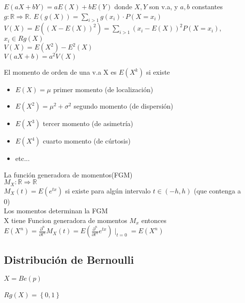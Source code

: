 \documentclass[a4paper,10pt]{article}
\begin{document}
 $E(aX+bY) = aE(X) + bE(Y)$ donde $X,Y$ son v.a, y $a,b$ constantes \\

 $g:\mathbb{R} \Rightarrow \mathbb{R}$. $E(g(X)) = \sum_{i>1} g(x_i) \cdot P(X =x_i)$ \\ 

 $V(X) = E({(X-E(X))}^{2}) = \sum_{i>1} {{(x_i-E(X))}^{2} P(X = x_i)}$, $x_i \in Rg(X)$ \\

\propiedad $V(X) = E(X^2)-E^2(X)$ \\

\propiedad $V(aX+b) = a^2V(X)$ 

 El momento de orden de una v.a X es $E(X^k)$ si existe
\begin{itemize}
	\item $E(X) = \mu$ primer momento (de localización)
	\item $E(X^2) = \mu^2+\sigma^2$ segundo momento (de dispersión)
	\item $E(X^3)$ tercer momento (de asimetría)
	\item $E(X^4)$ cuarto momento (de cúrtosis)
	\item etc...
\end{itemize}

 La función generadora de momentos(FGM) \\
	$M_X : \mathbb{R} \Rightarrow \mathbb{R}$ \\
	$M_X(t) = E(e^{tx})$ si existe para algún intervalo $t \in (-h,h)$ (que contenga a 0) \\

\propiedad Los momentos determinan la FGM \\ 

\teorema X tiene Funcion generadora de momentos $M_x$  entonces \\
$E(X^n)=\frac{\partial^n}{\partial t^n} {M_X(t)} = E \left( \frac{\partial^n}{\partial t^n} {e^{tx}}\right) \mid_{t=0} = E({X^n})$ 

\subsection{Distribución de Bernoulli}
\distribucion $X=Be(p)$ \\ \\
\rangoVar $Rg(X)=\left\lbrace 0,1 \right\rbrace$ \\
\end{document}
